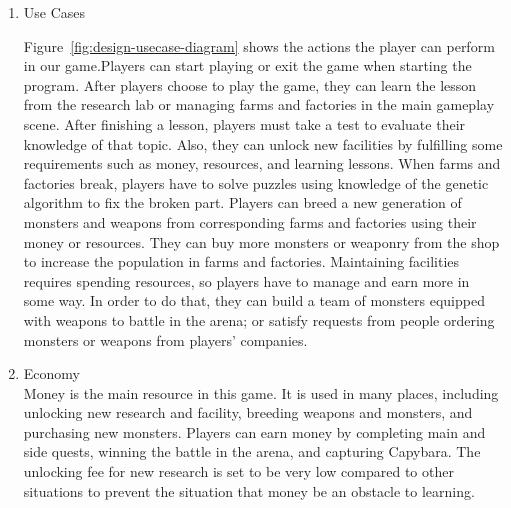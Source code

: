 \documentclass[12pt,oneside,openright,a4paper]{cpe-english-project}
\begin{document}
\begin{itemize}
\begin{enumerate}
	\item Use Cases \\
	\begin{minipage}[c]{\textwidth}\centering
	\label{fig:design-usecase-diagram}
	\end{minipage}
	Figure~\ref{fig:design-usecase-diagram} shows the actions the player can perform in our game.Players can start playing or exit the game when starting the program. After players choose to play the game, they can learn the lesson from the research lab or managing farms and factories in the main gameplay scene. After finishing a lesson, players must take a test to evaluate their knowledge of that topic. Also, they can unlock new facilities by fulfilling some requirements such as money, resources, and learning lessons. When farms and factories break, players have to solve puzzles using knowledge of the genetic algorithm to fix the broken part. Players can breed a new generation of monsters and weapons from corresponding farms and factories using their money or resources. They can buy more monsters or weaponry from the shop to increase the population in farms and factories. Maintaining facilities requires spending resources, so players have to manage and earn more in some way. In order to do that, they can build a team of monsters equipped with weapons to battle in the arena; or satisfy requests from people ordering monsters or weapons from players' companies.

	\item Economy \\
	Money is the main resource in this game. It is used in many places, including unlocking new research and facility, breeding weapons and monsters, and purchasing new monsters. Players can earn money by completing main and side quests, winning the battle in the arena, and capturing Capybara. The unlocking fee for new research is set to be very low compared to other situations to prevent the situation that money be an obstacle to learning.
\end{enumerate}


\end{itemize}
\end{document}
